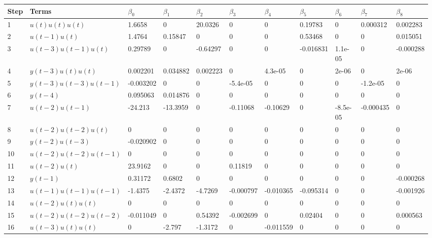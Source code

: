 \begin{tabular}{lllllllllll}
Step & Terms & $\beta_{0}$ & $\beta_{1}$ & $\beta_{2}$ & $\beta_{3}$ & $\beta_{4}$ & $\beta_{5}$ & $\beta_{6}$ & $\beta_{7}$ & $\beta_{8}$ \\ 
\hline 
1 & $u(t)u(t)u(t)$ & 1.6658 & 0 & 20.0326 & 0 & 0 & 0.19783 & 0 & 0.000312 & 0.002283 \\ 
2 & $u(t-1)u(t)$ & 1.4764 & 0.15847 & 0 & 0 & 0 & 0.53468 & 0 & 0 & 0.015051 \\ 
3 & $u(t-3)u(t-1)u(t)$ & 0.29789 & 0 & -0.64297 & 0 & 0 & -0.016831 & 1.1e-05 & 0 & -0.000288 \\ 
4 & $y(t-3)u(t)u(t)$ & 0.002201 & 0.034882 & 0.002223 & 0 & 4.3e-05 & 0 & 2e-06 & 0 & 2e-06 \\ 
5 & $y(t-3)u(t-3)u(t-1)$ & -0.003202 & 0 & 0 & -5.4e-05 & 0 & 0 & 0 & -1.2e-05 & 0 \\ 
6 & $y(t-4)$ & 0.095063 & 0.014876 & 0 & 0 & 0 & 0 & 0 & 0 & 0 \\ 
7 & $u(t-2)u(t-1)$ & -24.213 & -13.3959 & 0 & -0.11068 & -0.10629 & 0 & -8.5e-05 & -0.000435 & 0 \\ 
8 & $u(t-2)u(t-2)u(t)$ & 0 & 0 & 0 & 0 & 0 & 0 & 0 & 0 & 0 \\ 
9 & $y(t-2)u(t-3)$ & -0.020902 & 0 & 0 & 0 & 0 & 0 & 0 & 0 & 0 \\ 
10 & $u(t-2)u(t-2)u(t-1)$ & 0 & 0 & 0 & 0 & 0 & 0 & 0 & 0 & 0 \\ 
11 & $u(t-2)u(t)$ & 23.9162 & 0 & 0 & 0.11819 & 0 & 0 & 0 & 0 & 0 \\ 
12 & $y(t-1)$ & 0.31172 & 0.6802 & 0 & 0 & 0 & 0 & 0 & 0 & -0.000268 \\ 
13 & $u(t-1)u(t-1)u(t-1)$ & -1.4375 & -2.4372 & -4.7269 & -0.000797 & -0.010365 & -0.095314 & 0 & 0 & -0.001926 \\ 
14 & $u(t-2)u(t)u(t)$ & 0 & 0 & 0 & 0 & 0 & 0 & 0 & 0 & 0 \\ 
15 & $u(t-2)u(t-2)u(t-2)$ & -0.011049 & 0 & 0.54392 & -0.002699 & 0 & 0.02404 & 0 & 0 & 0.000563 \\ 
16 & $u(t-3)u(t)u(t)$ & 0 & -2.797 & -1.3172 & 0 & -0.011559 & 0 & 0 & 0 & 0 \\ 
\hline 
\end{tabular}